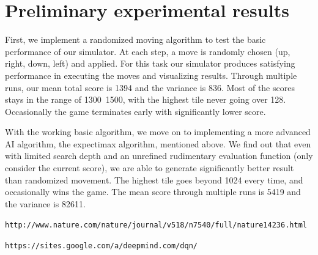 \documentclass[11pt]{article}
\begin{document}
\section{Preliminary experimental results}

First, we implement a randomized moving algorithm to test the basic performance of our simulator. At each step, a move is randomly chosen (up, right, down, left) and applied. For this task our simulator produces satisfying performance in executing the moves and visualizing results. Through multiple runs, our mean total score is 1394 and the variance is 836. Most of the scores stays in the range of 1300~1500, with the highest tile never going over 128. Occasionally the game terminates early with significantly lower score.

With the working basic algorithm, we move on to implementing a more advanced AI algorithm, the expectimax algorithm, mentioned above. We find out that even with limited search depth and an unrefined rudimentary evaluation function (only consider the current score), we are able to generate significantly better result than randomized movement. The highest tile goes beyond 1024 every time, and occasionally wins the game. The mean score through multiple runs is 5419 and the variance is 82611.

\begin{thebibliography}{9}

 \texttt{http://www.nature.com/nature/journal/v518/n7540/full/nature14236.html}

 \texttt{https://sites.google.com/a/deepmind.com/dqn/}

\end{thebibliography}
\end{document}

